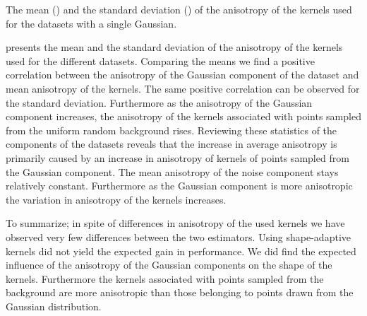 	\begin{table}
		\centering
		
		\caption{The mean (\mean) and the standard deviation (\SD) of the anisotropy of the kernels used for the datasets with a single Gaussian.}
		\label{tab:results:singleSphere:anisotropy}
	\end{table}
	 presents the mean and the standard deviation of the anisotropy of the kernels used for the different datasets. Comparing the means we find a positive correlation between the anisotropy of the Gaussian component of the dataset and mean anisotropy of the kernels. The same positive correlation can be observed for the standard deviation. Furthermore as the anisotropy of the Gaussian component increases, the anisotropy of the kernels associated with points sampled from the uniform random background rises.
	Reviewing these statistics of the components of the datasets reveals that the increase in average anisotropy is primarily caused by an increase in anisotropy of kernels of points sampled from the Gaussian component. The mean anisotropy of the noise component stays relatively constant. Furthermore as the Gaussian component is more anisotropic the variation in anisotropy of the kernels increases.

To summarize; in spite of differences in anisotropy of the used kernels we have observed very few differences between the two estimators. Using shape-adaptive kernels did not yield the expected gain in performance. We did find the expected influence of the anisotropy of the Gaussian components on the shape of the kernels. Furthermore the kernels associated with points sampled from the background are more anisotropic than those belonging to points drawn from the Gaussian distribution. 
